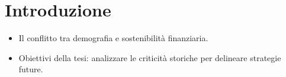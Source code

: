 \chapter*{Introduzione}
\begin{itemize}
    \item Il conflitto tra demografia e sostenibilità finanziaria.
    \item Obiettivi della tesi: analizzare le criticità storiche per delineare strategie future.
\end{itemize}

